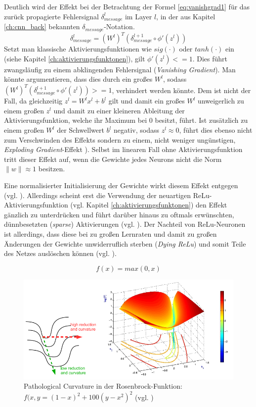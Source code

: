Deutlich wird der Effekt bei der Betrachtung der Formel \ref{eq:vanishgrad1} für das zurück propagierte Fehlersignal $\delta_{message}^l$ im Layer $l$, in der aus Kapitel  \ref{ch:cnn_back} bekannten $\delta_{message}$-Notation.
\begin{equation}
\label{eq:vanishgrad1} 
\delta_{message}^{l} = (W^{l})^T (\delta_{message}^{l+1} \circ \phi'(z^l))
\end{equation}
Setzt man klassische Aktivierungsfunktionen wie $sig(\cdot)$ oder $tanh(\cdot)$ ein (siehe Kapitel \ref{ch:aktivierungsfunktonen}), gilt $\phi'(z^l) <= 1 $. Dies führt zwangsläufig zu einem abklingenden Fehlersignal (\textit{Vanishing Gradient}). Man könnte argumentieren, dass dies durch ein großes $W^l$, sodass $ (W^{l})^T (\delta_{message}^{l+1} \circ \phi'(z^l)) >= 1$, verhindert werden könnte. Dem ist nicht der Fall, da gleichzeitig $z^l = W^lx^l + b^l$ gilt und damit ein großes $W^l$ unweigerlich zu einem großen $z^l$ und damit zu einer kleineren Ableitung der Aktivierungsfunktion, welche ihr Maximum bei $0$ besitzt, führt. Ist zusätzlich zu einem großen $W^l$ der Schwellwert $b^l$ negativ, sodass $z^l \approx 0$, führt dies ebenso nicht zum Verschwinden des Effekts sondern zu einem, nicht weniger ungünstigen, \textit{Exploding Gradient}-Effekt \cite[vgl.][Kapitel 5]{Nielsen2015}). Selbst im linearen Fall ohne Aktivierungsfunktion tritt dieser Effekt auf, wenn die Gewichte jedes Neurons nicht die Norm $\|w\| \approx 1 $ besitzen.
 
Eine normalisierter Initialisierung der Gewichte wirkt diesem Effekt entgegen (vgl. \cite{Glorot2010}). Allerdings scheint erst die Verwendung der neuartigen ReLu-Aktivierungsfunktion (vgl. Kapitel \ref{ch:aktivierungsfunktonen}) den Effekt gänzlich zu unterdrücken und führt darüber hinaus zu oftmals er\-wünsch\-ten, dünnbesetzten (\textit{sparse}) Aktivierungen (vgl. \cite{Glorot2011}). Der Nachteil von ReLu-Neuronen ist allerdings, dass diese bei zu großen Lernraten und damit zu großen Änderungen der Gewichte unwiderruflich sterben (\textit{Dying ReLu}) und somit Teile des Netzes auslöschen können (vgl. \cite{Maas2013}).   


\begin{equation} 
	f(x) =  max(0,x) 
\end{equation}


\begin{figure}
\centering
\includegraphics[width=0.5\linewidth]{images/4_pathological_curvature}
\caption[]{Pathological Curvature in der Rosenbrock-Funktion: $f(x,y = (1-x)^2 + 100(y -x^2)^2$ (vgl. \cite{Martens2010})}
\label{fig:4_pathological_curvature}
\end{figure}

